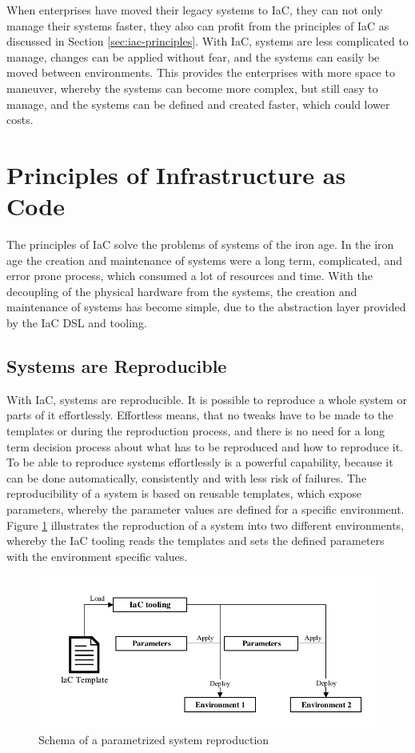When enterprises have moved their legacy systems to IaC, they can not only manage their systems faster, they also can profit from the principles of IaC as discussed in Section \vref{sec:iac-principles}. With IaC, systems are less complicated to manage, changes can be applied without fear, and the systems can easily be moved between environments. This provides the enterprises with more space to maneuver, whereby the systems can become more complex, but still easy to manage, and the systems can be defined and created faster, which could lower costs.    

\section{Principles of Infrastructure as Code}
\label{sec:iac-principles}
The principles of IaC solve the problems of systems of the iron age. In the iron age the creation and maintenance of systems were a long term, complicated, and error prone process, which consumed a lot of resources and time. With the decoupling of the physical hardware from the systems, the creation and maintenance of systems has become simple, due to the abstraction layer provided by the IaC DSL and tooling. 

\subsection{Systems are Reproducible}
\label{sec:iac-principles-reproducibility}
With IaC, systems are reproducible. It is possible to reproduce a whole system or parts of it effortlessly. Effortless means, that no tweaks have to be made to the templates or during the reproduction process, and there is no need for a long term decision process about what has to be reproduced and how to reproduce it. To be able to reproduce systems effortlessly is a powerful capability, because it can be done automatically, consistently and with less risk of failures. The reproducibility of a system is based on reusable templates, which expose parameters, whereby the parameter values are defined for a specific environment. Figure \ref{fig:reproduce-infrastructure} illustrates the reproduction of a system into two different environments, whereby the IaC tooling reads the templates and sets the defined parameters with the environment specific values\cite{Morris2016}.

\begin{figure}[htbp]
	\centering
	\includegraphics[scale=1]{images/reproduce-infrastructure.pdf}
	\caption{Schema of a parametrized system reproduction}
	\label{fig:reproduce-infrastructure}
\end{figure} 


